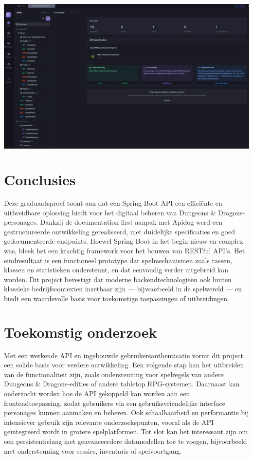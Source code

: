 \documentclass[a0,portrait]{hogent-poster}
\begin{document}
\begin{multicols}{2}
\begin{center}
  \captionsetup{type=figure}
  \includegraphics[width=1.0\linewidth]{Poster.png}
\end{center}

\section{Conclusies}

Deze graduaatsproef toont aan dat een Spring Boot API een efficiënte en uitbreidbare oplossing biedt voor het digitaal beheren van Dungeons \& Dragons-personages. Dankzij de documentation-first aanpak met Apidog werd een gestructureerde ontwikkeling gerealiseerd, met duidelijke specificaties en goed gedocumenteerde endpoints.
Hoewel Spring Boot in het begin nieuw en complex was, bleek het een krachtig framework voor het bouwen van RESTful API's. Het eindresultaat is een functioneel prototype dat spelmechanismen zoals rassen, klassen en statistieken ondersteunt, en dat eenvoudig verder uitgebreid kan worden.
Dit project bevestigt dat moderne backendtechnologieën ook buiten klassieke bedrijfscontexten inzetbaar zijn — bijvoorbeeld in de spelwereld — en biedt een waardevolle basis voor toekomstige toepassingen of uitbreidingen.

\section{Toekomstig onderzoek}

Met een werkende API en ingebouwde gebruikersauthenticatie vormt dit project een solide basis voor verdere ontwikkeling. Een volgende stap kan het uitbreiden van de functionaliteit zijn, zoals ondersteuning voor spelregels van andere Dungeons \& Dragons-edities of andere tabletop RPG-systemen.
Daarnaast kan onderzocht worden hoe de API gekoppeld kan worden aan een frontendtoepassing, zodat gebruikers via een gebruiksvriendelijke interface personages kunnen aanmaken en beheren. Ook schaalbaarheid en performantie bij intensiever gebruik zijn relevante onderzoekspunten, vooral als de API geïntegreerd wordt in grotere spelplatformen.
Tot slot kan het interessant zijn om een persistentielaag met geavanceerdere datamodellen toe te voegen, bijvoorbeeld met ondersteuning voor sessies, inventaris of spelvoortgang.

\end{multicols}
\end{document}
